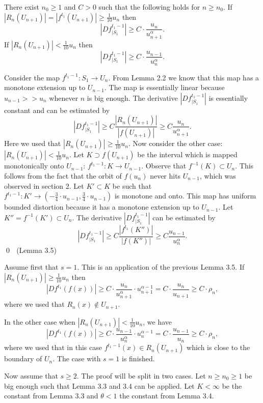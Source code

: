  There exist $n_0\ge 1$ and  $C>0$ such that the following 
holds for $n\ge n_0$. If $|R_n(U_{n+1})|=|f^{t_1}(U_{n+1})|\ge 
\frac{1}{10} u_n$ then
$$
|Df^{t_1-1}_{|S_1}|\ge C\cdot \frac{u_n}{u_{n+1}^\alpha}.
$$
If $|R_n(U_{n+1})|<\frac{1}{10} u_n$ then
$$
|Df^{t_1-1}_{|S_1}|\ge C\cdot \frac{u_{n-1}}{u_n^\alpha}.
$$
\endproclaim

 Consider the map $f^{t_1-1}: S_1\to U_n$. From Lemma 2.2 we know 
that this map has a monotone extension up to $U_{n-1}$. The map is essentially
linear because $u_{n-1}>>u_n$ whenever $n$ is big enough. 
The derivative $|Df^{t_1-1}_{|S_1}|$ is
essentially constant and can be estimated by
$$
|Df^{t_1-1}_{|S_1}|\ge C\frac{|R_n(U_{n+1})|}{|f(U_{n+1})|}
                        \ge C\frac{u_n}{u_{n+1}^\alpha}.
$$
Here we used that $|R_n(U_{n+1})|\ge \frac{1}{10} u_n$.
Now consider the other case: 
$|R_n(U_{n+1})|< \frac{1}{10} u_n$. Let $K\supset f(U_{n+1})$
be the interval which is mapped monotonically onto $U_{n-1}$:
$f^{t_1-1}:K\to U_{n-1}$. Observe that $f^{-1}(K)\subset U_n$. This follows 
from the fact that the orbit of $f(u_n)$ never hits $U_{n-1}$, which was 
observed in section 2. Let $K'\subset K$
be such that $f^{t_1-1}: K'\to (-\frac34 \cdot u_{n-1}, 
                                 \frac34\cdot u_{n-1})$ is monotone and onto.
This map 
has uniform bounded distortion because it has a monotone extension up to
$U_{n-1}$. Let $K''=f^{-1}(K')\subset U_n$. The derivative  
$|Df^{t_1-1}_{|S_1}|$ can be estimated by
$$
|Df^{t_1-1}_{|S_1}|\ge C\frac{|f^{t_1}(K'')|}{|f(K'')|}
                        \ge C \frac{u_{n-1}}{u_n^\alpha}.
$$
\hfill\hfill\qed $\,\,$ (Lemma 3.5) 
\enddemo

 Assume first that $s=1$. 
This is an application of the previous Lemma 3.5. If 
$|R_n(U_{n+1})|\ge \frac{1}{10} u_n$ then
$$
|Df^{t_1}(f(x))|\ge C\cdot \frac{u_n}{u_{n+1}^\alpha}\cdot u_{n+1}^{\alpha-1}=
   C\cdot \frac{u_n}{u_{n+1}}\ge C\cdot \rho_n,
$$
where we used that $R_n(x)\notin U_{n+1}$.

\flushpar
In the other case when $|R_n(U_{n+1})|< \frac{1}{10} u_n$, we have 
$$
|Df^{t_1}(f(x))|\ge C\cdot \frac{u_{n-1}}{u_n^\alpha}\cdot u_n^{\alpha-1}
             =   C\cdot \frac{u_{n-1}}{u_{n}}\ge C\cdot \rho_n,
$$
where we used that in this case $f^{t_1-1}(x)\in R_n(U_{n+1})$
which is close to the boundary of $U_{n}$. The case with $s=1$ is finished. 

\bigskip

\flushpar
Now assume that $s\ge 2$. The proof will be split in two 
cases. Let $n\ge n_0\ge 1$ be big enough such that Lemma 3.3 and 3.4 can be 
applied. Let $K<\infty$ be the constant from Lemma 3.3 and $\theta<1$
the constant from Lemma 3.4.
 
